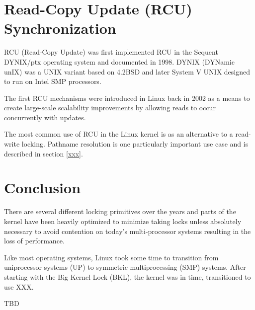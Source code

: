 
\section{Read-Copy Update (RCU) Synchronization}

RCU (Read-Copy Update) was first implemented RCU in the Sequent DYNIX/ptx operating system and documented in 1998. DYNIX (DYNamic unIX) was a UNIX variant based on 4.2BSD and later System V UNIX designed to run on Intel SMP processors.

The first RCU mechanisms were introduced in Linux back in 2002 as a means to create large-scale scalability improvements by allowing reads to occur concurrently with updates.

The most common use of RCU in the Linux kernel is as an alternative to a read-write locking. Pathname resolution  is one particularly important use case and is described in section \ref{xxx}.



\section{Conclusion}

There are several different locking primitives over the years and parts of the kernel have been heavily optimized to minimize taking locks unless absolutely necessary to avoid contention on today's multi-processor systems resulting in the loss of performance.

Like most operating systems, Linux took some time to transition from uniprocessor systems (UP) to symmetric multiprocessing (SMP) systems. After starting with the Big Kernel Lock (BKL), the kernel was in time, transitioned to use XXX.

TBD

